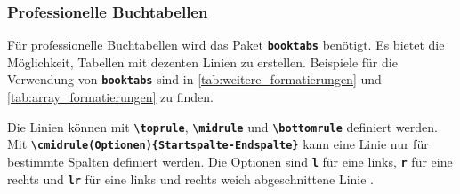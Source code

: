 \subsubsection{Professionelle Buchtabellen}
Für professionelle Buchtabellen wird das Paket \textbf{\texttt{booktabs}} benötigt. Es bietet die Möglichkeit, Tabellen mit dezenten Linien zu erstellen.
Beispiele für die Verwendung von \textbf{\texttt{booktabs}} sind in \autoref{tab:weitere_formatierungen} und \autoref{tab:array_formatierungen} zu finden.

Die Linien können mit \textbf{\texttt{\textbackslash toprule}}, \textbf{\texttt{\textbackslash midrule}} und \textbf{\texttt{\textbackslash bottomrule}} definiert werden. Mit \newline \textbf{\texttt{\textbackslash cmidrule(Optionen)\{Startspalte-Endspalte\}}} kann eine Linie nur für bestimmte Spalten definiert werden. Die Optionen sind  \textbf{\texttt{l}} für eine links, \textbf{\texttt{r}} für eine rechts und \textbf{\texttt{lr}} für eine links und rechts weich abgeschnittene Linie .

